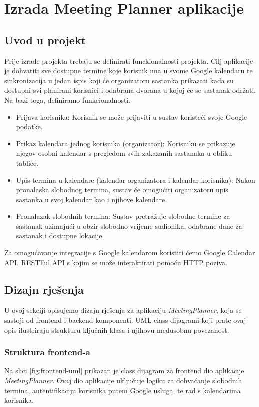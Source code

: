 \documentclass{foi}
\begin{document}
\chapter{Izrada Meeting Planner aplikacije}
\section{Uvod u projekt}
Prije izrade projekta trebaju se definirati funckionalnosti projekta. Cilj aplikacije je dohvatiti sve dostupne termine koje korisnik ima u svome Google kalendaru te sinkronizacija u jedan ispis koji će organizatoru sastanka prikazati kada su dostupni svi planirani korisnici i odabrana dvorana u kojoj će se sastanak održati. 
Na bazi toga, definiramo funkcionalnosti.
\begin{itemize}
    \item Prijava korisnika: Korisnik se može prijaviti u sustav koristeći svoje Google podatke.
    \item Prikaz kalendara jednog korisnika (organizator): Korisniku se prikazuje njegov osobni kalendar s pregledom svih zakazanih sastanaka u obliku tablice.
    \item Upis termina u kalendare (kalendar organizatora i kalendar korisnika): Nakon pronalaska slobodnog termina, sustav će omogućiti organizatoru upis sastanka u svoj kalendar kao i njihove kalendare.
    \item Pronalazak slobodnih termina: Sustav pretražuje slobodne termine za sastanak uzimajući u obzir slobodno vrijeme sudionika, odabrane dane za sastanak i dostupne lokacije.
\end{itemize}
Za omogućavanje integracije s Google kalendarom koristiti ćemo Google Calendar API. RESTFul API s kojim se može interaktirati pomoću HTTP poziva.
\section{Dizajn rješenja}

U ovoj sekciji opisujemo dizajn rješenja za aplikaciju \textit{MeetingPlanner}, koja se sastoji od frontend i backend komponenti. UML class dijagrami koji prate ovaj opis ilustriraju strukturu ključnih klasa i njihovu međusobnu povezanost.

\subsection{Struktura frontend-a}

Na slici \ref{fig:frontend-uml} prikazan je class dijagram za frontend dio aplikacije \textit{MeetingPlanner}. Ovaj dio aplikacije uključuje logiku za dohvaćanje slobodnih termina, autentifikaciju korisnika putem Google usluga, te rad s kalendarima korisnika.
\end{document}
